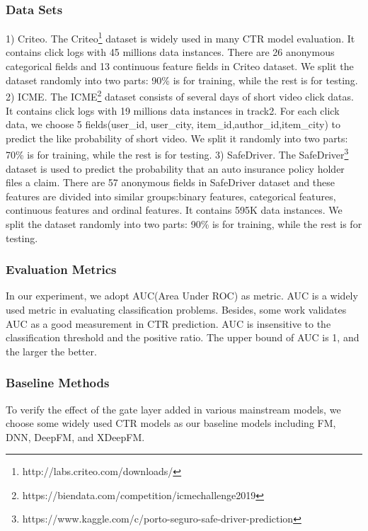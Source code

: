 \documentclass[sigconf,nonacm=true]{acmart}
\begin{document}
\subsubsection{Data Sets} 1) Criteo.
The Criteo\footnote{http://labs.criteo.com/downloads/} dataset is widely used in many CTR model evaluation. 
It contains click logs with 45 millions data instances. 
There are 26 anonymous categorical fields and 13 continuous feature fields in Criteo dataset.
We split the dataset randomly into two parts: 90\% is for training,
while the rest is for testing. 2) ICME. The ICME\footnote{https://biendata.com/competition/icmechallenge2019}
dataset consists of several days of short video click datas. It contains click logs with 19 millions data instances in track2. 
For each click data, we choose 5 fields(user\_id, user\_city, item\_id,author\_id,item\_city) to predict the like probability of short video.
We split it randomly into two parts: 70\% is for training, while the rest is for testing. 3) SafeDriver. The SafeDriver\footnote{https://www.kaggle.com/c/porto-seguro-safe-driver-prediction}
dataset is used to predict the probability that an auto insurance policy holder files a claim.
There are 57 anonymous fields in SafeDriver dataset and these features are divided into similar groups:binary features, categorical features, continuous features and ordinal features. 
It contains 595K data instances. We split the dataset randomly into two parts: 90\% is for training, while the rest is for testing.
\subsubsection{Evaluation Metrics}
In our experiment, we adopt AUC(Area Under ROC) as metric. AUC is a widely used metric in evaluating classification problems. Besides, some work validates AUC as a good measurement in CTR prediction\cite{graepel2010web}. 
AUC is insensitive to the classification threshold and the positive ratio. 
The upper bound of AUC is 1, and the larger the better. 

\subsubsection{Baseline Methods}
To verify the effect of the gate layer added in various mainstream models, we choose some widely used CTR models as our baseline models including FM\cite{rendle2010factorization,rendle2012factorization}, DNN, DeepFM\cite{guo2017deepfm}, and XDeepFM\cite{lian2018xdeepfm}.
\end{document}
